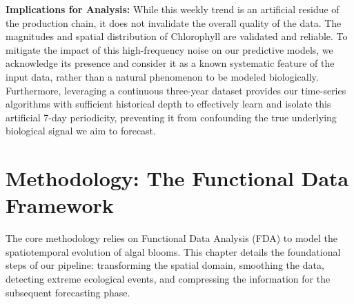\textbf{Implications for Analysis:}
While this weekly trend is an artificial residue of the production chain, it does not invalidate the overall quality of the data. The magnitudes and spatial distribution of Chlorophyll are validated and reliable. To mitigate the impact of this high-frequency noise on our predictive models, we acknowledge its presence and consider it as a known systematic feature of the input data, rather than a natural phenomenon to be modeled biologically. Furthermore, leveraging a continuous three-year dataset provides our time-series algorithms with sufficient historical depth to effectively learn and isolate this artificial 7-day periodicity, preventing it from confounding the true underlying biological signal we aim to forecast.















\clearpage
\newpage
\section{Methodology: The Functional Data Framework}
\label{sec:methodology}

The core methodology relies on Functional Data Analysis (FDA) to model the spatiotemporal evolution of algal blooms. This chapter details the foundational steps of our pipeline: transforming the spatial domain, smoothing the data, detecting extreme ecological events, and compressing the information for the subsequent forecasting phase.

